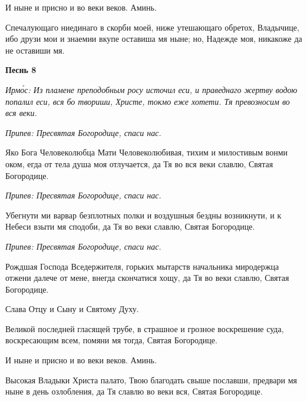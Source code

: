    И ныне и присно и во веки веков. Аминь.



   Спечалующаго ниединаго в скорби моей, ниже утешающаго обретох,
Владычице, ибо друзи мои и знаемии вкупе оставиша мя ныне; но, Надежде
моя, никакоже да не оставиши мя.



 

\bfseries Песнь 8\normalfont{}


 \itshape Ирмо́с:\normalfont{} Из пламене преподобным росу источил еси, и праведнаго жертву водою
попалил еси, вся бо твориши, Христе, токмо еже хотети. Тя превозносим во вся
веки.



 \itshape Припев:\normalfont{} Пресвятая Богородице, спаси нас.



   Яко Бога Человеколюбца Мати Человеколюбивая, тихим и милостивым
вонми оком, егда от тела душа моя отлучается, да Тя во вся веки славлю,
Святая Богородице.



 \itshape Припев:\normalfont{} Пресвятая Богородице, спаси нас.



   Убегнути ми варвар безплотных полки и воздушныя бездны возникнути,
и к Небеси взыти мя сподоби, да Тя во веки славлю, Святая Богородице.



 \itshape Припев:\normalfont{} Пресвятая Богородице, спаси нас.



   Рождшая Господа Вседержителя, горьких мытарств начальника
миродержца отжени далече от мене, внегда скончатися хощу, да Тя во веки
славлю, Святая Богородице.




   Слава Отцу и Сыну и Святому Духу.



   Великой последней гласящей трубе, в страшное и грозное воскрешение
суда, воскресающим всем, помяни мя тогда, Святая Богородице.



   И ныне и присно и во веки веков. Аминь.



   Высокая Владыки Христа палато, Твою благодать свыше пославши,
предвари мя ныне в день озлобления, да Тя славлю во веки вся, Святая
Богородице.



 

